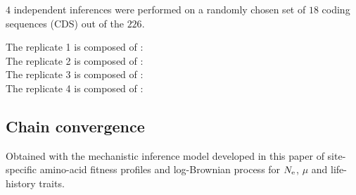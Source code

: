 \documentclass{article}
\begin{document}
	$4$ independent inferences were performed on a randomly chosen set of $18$ coding sequences ({CDS}) out of the $226$.

	The replicate 1 is composed of :\\
	

	The replicate 2 is composed of :\\
	

	The replicate 3 is composed of :\\
	

	The replicate 4 is composed of :\\
	

	\subsection{Chain convergence}
	\label{subsec:chain-convergence}
	Obtained with the mechanistic inference model developed in this paper of site-specific amino-acid fitness profiles and log-Brownian process for $N_{\text{e}}$, $\mu$ and life-history traits.
\end{document}
